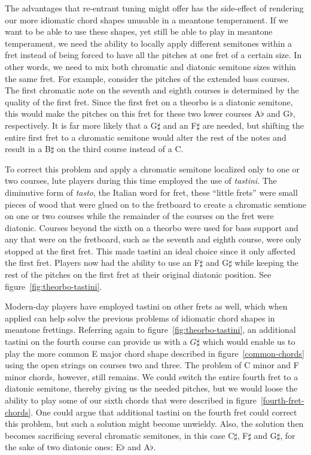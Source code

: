 The advantages that re-entrant tuning might offer has the side-effect of rendering our
more idiomatic chord shapes unusable in a meantone temperament.  If we want to be able to
use these shapes, yet still be able to play in meantone temperament, we need the ability
to locally apply different semitones within a fret instead of being forced to have all the
pitches at one fret of a certain size. In other words, we need to mix both chromatic and
diatonic semitone sizes within the same fret.  For example, consider the pitches of the
extended bass courses. The first chromatic note on the seventh and eighth courses is
determined by the quality of the first fret.  Since the first fret on a theorbo is a
diatonic semitone, this would make the pitches on this fret for these two lower courses
A$\flat$ and G$\flat$, respectively.  It is far more likely that a G$\sharp$ and an
F$\sharp$ are needed, but shifting the entire first fret to a chromatic semitone would
alter the rest of the notes and result in a B$\sharp$ on the third course instead of a C.

To correct this problem and apply a chromatic semitone localized only to one or two
courses, lute players during this time employed the use of \textit{tastini}.  The
diminutive form of \textit{tasto}, the Italian word for fret, these ``little frets'' were
small pieces of wood that were glued on to the fretboard to create a chromatic semtione on
one or two courses while the remainder of the courses on the fret were diatonic.  Courses
beyond the sixth on a theorbo were used for bass support and any that were on the
fretboard, such as the seventh and eighth course, were only stopped at the first fret.
This made tastini an ideal choice since it only affected the first fret. Players now had
the ability to use an F$\sharp$ and G$\sharp$ while keeping the rest of the pitches on the
first fret at their original diatonic position. See figure~\ref{fig:theorbo-tastini}.



Modern-day players have employed tastini on other frets as well, which when applied
can help solve the previous problems of idiomatic chord shapes in meantone frettings.
Referring again to figure~\ref{fig:theorbo-tastini}, an additional tastini on the
fourth course can provide us with a $G\sharp$ which would enable us to play the more
common E major chord shape described in figure~\ref{common-chords} using the open
strings on courses two and three.  The problem of C minor and F minor chords, however,
still remains.  We could switch the entire fourth fret to a diatonic semitone, thereby giving
us the needed pitches, but we would loose the ability to play some of our
sixth chords that were described in figure~\ref{fourth-fret-chords}.  One could argue
that additional tastini on the fourth fret could correct this problem, but such a solution
might become unwieldy.  Also, the solution then becomes sacrificing several chromatic
semitones, in this case C$\sharp$, F$\sharp$ and G$\sharp$, for the sake of two diatonic
ones: E$\flat$ and A$\flat$.

